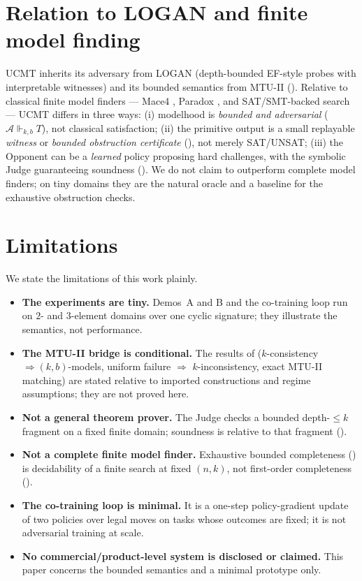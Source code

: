 \documentclass[11pt]{article}
\theoremstyle{definition}
\theoremstyle{plain}
\newcommand{\Thy}{T}
\newcommand{\Struct}{\mathcal{A}}
\newcommand{\kbforces}{\Vdash_{k,b}}      %
\begin{document}
\section{Relation to LOGAN and finite model finding}

UCMT inherits its adversary from LOGAN (depth-bounded EF-style probes with
interpretable witnesses) and its bounded semantics from MTU-II ().
Relative to classical finite model finders --- Mace4 \cite{McCune2003Mace4},
Paradox \cite{ClaessenSorensson2003Paradox}, and SAT/SMT-backed search --- UCMT
differs in three ways: (i) modelhood is \emph{bounded and adversarial}
($\Struct \kbforces \Thy$), not classical satisfaction; (ii) the primitive output
is a small replayable \emph{witness} or \emph{bounded obstruction certificate}
(), not merely SAT/UNSAT; (iii) the Opponent can be a
\emph{learned} policy proposing hard challenges, with the symbolic Judge
guaranteeing soundness (). We do not claim to outperform
complete model finders; on tiny domains they are the natural oracle and a baseline
for the exhaustive obstruction checks.

\section{Limitations}
\label{sec:limitations}

We state the limitations of this work plainly.
\begin{itemize}[leftmargin=1.5em]
\item \textbf{The experiments are tiny.} Demos~A and B and the co-training loop run on $2$- and
$3$-element domains over one cyclic signature; they illustrate the semantics, not performance.
\item \textbf{The MTU-II bridge is conditional.} The results of 
($k$-consistency $\Rightarrow (k,b)$-models, uniform failure $\Rightarrow$ $k$-inconsistency, exact
MTU-II matching) are stated relative to imported constructions and regime assumptions; they are not
proved here.
\item \textbf{Not a general theorem prover.} The Judge checks a bounded depth-$\le k$ fragment on a
fixed finite domain; soundness is relative to that fragment ().
\item \textbf{Not a complete finite model finder.} Exhaustive bounded completeness
() is decidability of a finite search at fixed $(n,k)$, not first-order
completeness ().
\item \textbf{The co-training loop is minimal.} It is a one-step policy-gradient update of two
policies over legal moves on tasks whose outcomes are fixed; it is not adversarial training at scale.
\item \textbf{No commercial/product-level system is disclosed or claimed.} This paper concerns the
bounded semantics and a minimal prototype only.
\end{itemize}
\end{document}
